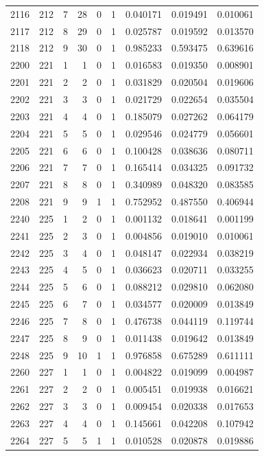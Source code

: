 \begin{longtable}{rrrrrrrrr}
2116 & 212 & 7 & 28 & 0 & 1 & 0.040171 & 0.019491 & 0.010061 \\
2117 & 212 & 8 & 29 & 0 & 1 & 0.025787 & 0.019592 & 0.013570 \\
2118 & 212 & 9 & 30 & 0 & 1 & 0.985233 & 0.593475 & 0.639616 \\
2200 & 221 & 1 & 1 & 0 & 1 & 0.016583 & 0.019350 & 0.008901 \\
2201 & 221 & 2 & 2 & 0 & 1 & 0.031829 & 0.020504 & 0.019606 \\
2202 & 221 & 3 & 3 & 0 & 1 & 0.021729 & 0.022654 & 0.035504 \\
2203 & 221 & 4 & 4 & 0 & 1 & 0.185079 & 0.027262 & 0.064179 \\
2204 & 221 & 5 & 5 & 0 & 1 & 0.029546 & 0.024779 & 0.056601 \\
2205 & 221 & 6 & 6 & 0 & 1 & 0.100428 & 0.038636 & 0.080711 \\
2206 & 221 & 7 & 7 & 0 & 1 & 0.165414 & 0.034325 & 0.091732 \\
2207 & 221 & 8 & 8 & 0 & 1 & 0.340989 & 0.048320 & 0.083585 \\
2208 & 221 & 9 & 9 & 1 & 1 & 0.752952 & 0.487550 & 0.406944 \\
2240 & 225 & 1 & 2 & 0 & 1 & 0.001132 & 0.018641 & 0.001199 \\
2241 & 225 & 2 & 3 & 0 & 1 & 0.004856 & 0.019010 & 0.010061 \\
2242 & 225 & 3 & 4 & 0 & 1 & 0.048147 & 0.022934 & 0.038219 \\
2243 & 225 & 4 & 5 & 0 & 1 & 0.036623 & 0.020711 & 0.033255 \\
2244 & 225 & 5 & 6 & 0 & 1 & 0.088212 & 0.029810 & 0.062080 \\
2245 & 225 & 6 & 7 & 0 & 1 & 0.034577 & 0.020009 & 0.013849 \\
2246 & 225 & 7 & 8 & 0 & 1 & 0.476738 & 0.044119 & 0.119744 \\
2247 & 225 & 8 & 9 & 0 & 1 & 0.011438 & 0.019642 & 0.013849 \\
2248 & 225 & 9 & 10 & 1 & 1 & 0.976858 & 0.675289 & 0.611111 \\
2260 & 227 & 1 & 1 & 0 & 1 & 0.004822 & 0.019099 & 0.004987 \\
2261 & 227 & 2 & 2 & 0 & 1 & 0.005451 & 0.019938 & 0.016621 \\
2262 & 227 & 3 & 3 & 0 & 1 & 0.009454 & 0.020338 & 0.017653 \\
2263 & 227 & 4 & 4 & 0 & 1 & 0.145661 & 0.042208 & 0.107942 \\
2264 & 227 & 5 & 5 & 1 & 1 & 0.010528 & 0.020878 & 0.019886 \\

\end{longtable}

